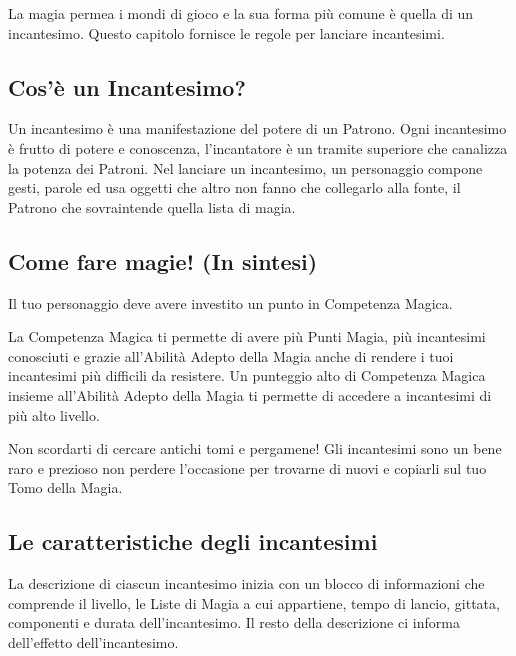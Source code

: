 \begin{multicols}{2}

La magia permea i mondi di gioco e la sua forma più comune è quella di un incantesimo. Questo capitolo fornisce le regole per lanciare incantesimi.

\medskip

\subsection{Cos'è un Incantesimo?}

Un incantesimo è una manifestazione del potere di un Patrono. Ogni incantesimo è frutto di potere e conoscenza, l'incantatore è un tramite superiore che canalizza la potenza dei Patroni. Nel lanciare un incantesimo, un personaggio compone gesti, parole ed usa oggetti che altro non fanno che collegarlo alla fonte, il Patrono che sovraintende quella lista di magia.

\subsection{Come fare magie! (In sintesi)}

Il tuo personaggio deve avere investito un punto in Competenza Magica.

La Competenza Magica ti permette di avere più Punti Magia, più incantesimi conosciuti e grazie all'Abilità Adepto della Magia anche di rendere i tuoi incantesimi più difficili da resistere. Un punteggio alto di Competenza Magica insieme all'Abilità Adepto della Magia ti permette di accedere a incantesimi di più alto livello.

Non scordarti di cercare antichi tomi e pergamene! Gli incantesimi sono un bene raro e prezioso non perdere l'occasione per trovarne di nuovi e copiarli sul tuo Tomo della Magia.

\subsection{Le caratteristiche degli incantesimi}\label{caratteristicheincantesimi}

La descrizione di ciascun incantesimo inizia con un blocco di informazioni che comprende il livello, le Liste di Magia a cui appartiene, tempo di lancio, gittata, componenti e durata dell'incantesimo. Il resto della descrizione ci informa dell'effetto dell'incantesimo.


\end{multicols}
